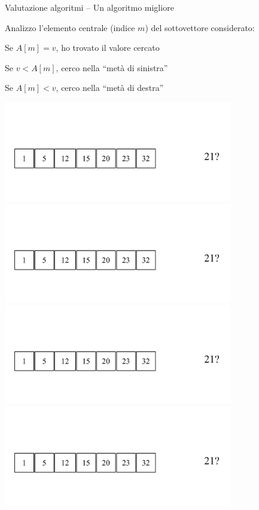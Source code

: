 \begin{frame}{Valutazione algoritmi -- Un algoritmo migliore}

\vspace{-9pt}
\begin{myboxtitle}
Analizzo l'elemento centrale (indice $m$) del sottovettore considerato:

\BIL
  \item Se $A[m]=v$, ho trovato il valore cercato
  \item Se $v<A[m]$, cerco nella “metà di sinistra”
  \item Se $A[m]<v$, cerco nella “metà di destra”
\EIL
\end{myboxtitle}

\vspace{-24pt}
\begin{overprint}
\centering\includegraphics[width=10cm,page=1]{binarysearch.pdf}
\centering\includegraphics[width=10cm,page=2]{binarysearch.pdf}
\centering\includegraphics[width=10cm,page=3]{binarysearch.pdf}
\centering\includegraphics[width=10cm,page=4]{binarysearch.pdf}

\end{overprint}
\end{frame}
